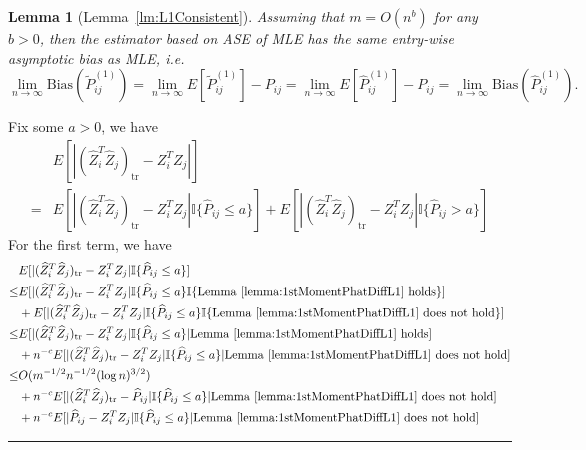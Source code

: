 \documentclass[a4paper]{article}
\newenvironment{proof}{{\bf Proof:  }}{\hfill\rule{2mm}{2mm}}
\newtheorem{lemma}[fact]{Lemma}
\renewcommand{\hat}{\widehat}
\begin{document}
\begin{lemma}[Lemma~\ref{lm:L1Consistent}]
\label{lm:L1Consistentproof}
Assuming that $m = O(n^b)$ for any $b > 0$, then the estimator based on ASE of MLE has the same entry-wise asymptotic bias as MLE, i.e.
\[
	\lim_{n \to \infty} \mathrm{Bias}(\widetilde{P}_{ij}^{(1)}) = \lim_{n \to \infty} E[\widetilde{P}_{ij}^{(1)}] - P_{ij} = \lim_{n \to \infty} E[\hat{P}^{(1)}_{ij}] - P_{ij}
    = \lim_{n \to \infty} \mathrm{Bias}(\hat{P}_{ij}^{(1)}).
\]
\end{lemma}
\begin{proof}
Fix some $a > 0$, we have
\begin{align*}
	& E[|(\hat{Z}_i^T \hat{Z}_j)_{\mathrm{tr}} - Z_i^T Z_j|] \\
	= & E[|(\hat{Z}_i^T \hat{Z}_j)_{\mathrm{tr}} - Z_i^T Z_j| \mathbb{I}\{\hat{P}_{ij} \le a\}]
	+ E[|(\hat{Z}_i^T \hat{Z}_j)_{\mathrm{tr}} - Z_i^T Z_j| \mathbb{I}\{\hat{P}_{ij} > a\}]
\end{align*}
For the first term, we have
\begin{align*}
	& E[|(\hat{Z}_i^T \hat{Z}_j)_{\mathrm{tr}} - Z_i^T Z_j| \mathbb{I}\{\hat{P}_{ij} \le a\}] \\
	\le & E[|(\hat{Z}_i^T \hat{Z}_j)_{\mathrm{tr}} - Z_i^T Z_j| \mathbb{I}\{\hat{P}_{ij} \le a\} \mathbb{I}\{\mathrm{Lemma\ } \ref{lemma:1stMomentPhatDiffL1} \mathrm{\ holds}\}] \\
	& + E[|(\hat{Z}_i^T \hat{Z}_j)_{\mathrm{tr}} - Z_i^T Z_j| \mathbb{I}\{\hat{P}_{ij} \le a\} \mathbb{I}\{\mathrm{Lemma\ } \ref{lemma:1stMomentPhatDiffL1} \mathrm{\ does\ not\ hold}\}] \\
	\le & E[|(\hat{Z}_i^T \hat{Z}_j)_{\mathrm{tr}} - Z_i^T Z_j| \mathbb{I}\{\hat{P}_{ij} \le a\} | \mathrm{Lemma\ } \ref{lemma:1stMomentPhatDiffL1} \mathrm{\ holds}] \\
	& + n^{-c} E[|(\hat{Z}_i^T \hat{Z}_j)_{\mathrm{tr}} - Z_i^T Z_j| \mathbb{I}\{\hat{P}_{ij} \le a\} | \mathrm{Lemma\ } \ref{lemma:1stMomentPhatDiffL1} \mathrm{\ does\ not\ hold}] \\
	\le & O(m^{-1/2} n^{-1/2} (\log n)^{3/2}) \\
	& + n^{-c} E[|(\hat{Z}_i^T \hat{Z}_j)_{\mathrm{tr}} - \hat{P}_{ij}| \mathbb{I}\{\hat{P}_{ij} \le a\}| \mathrm{Lemma\ } \ref{lemma:1stMomentPhatDiffL1} \mathrm{\ does\ not\ hold}] \\
	& + n^{-c} E[|\hat{P}_{ij} - Z_i^T Z_j| \mathbb{I}\{\hat{P}_{ij} \le a\}| \mathrm{Lemma\ } \ref{lemma:1stMomentPhatDiffL1} \mathrm{\ does\ not\ hold}] \\

\end{align*}
\end{proof}
\end{document}

